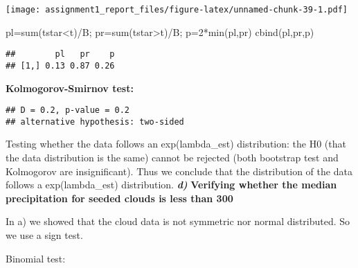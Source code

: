 \documentclass[
]{article}
\newenvironment{Shaded}{\begin{snugshade}}{\end{snugshade}}
\newcommand{\AttributeTok}[1]{\textcolor[rgb]{0.77,0.63,0.00}{#1}}
\newcommand{\DecValTok}[1]{\textcolor[rgb]{0.00,0.00,0.81}{#1}}
\newcommand{\FloatTok}[1]{\textcolor[rgb]{0.00,0.00,0.81}{#1}}
\newcommand{\FunctionTok}[1]{\textcolor[rgb]{0.00,0.00,0.00}{#1}}
\newcommand{\NormalTok}[1]{#1}
\newcommand{\OtherTok}[1]{\textcolor[rgb]{0.56,0.35,0.01}{#1}}
\newcommand{\SpecialCharTok}[1]{\textcolor[rgb]{0.00,0.00,0.00}{#1}}
\newcommand{\StringTok}[1]{\textcolor[rgb]{0.31,0.60,0.02}{#1}}
\begin{document}
\texttt{[image: assignment1\_report\_files/figure-latex/unnamed-chunk-39-1.pdf]}

\begin{Shaded}
\begin{Highlighting}[]
\NormalTok{pl}\OtherTok{=}\FunctionTok{sum}\NormalTok{(tstar}\SpecialCharTok{\textless{}}\NormalTok{t)}\SpecialCharTok{/}\NormalTok{B; pr}\OtherTok{=}\FunctionTok{sum}\NormalTok{(tstar}\SpecialCharTok{\textgreater{}}\NormalTok{t)}\SpecialCharTok{/}\NormalTok{B; p}\OtherTok{=}\DecValTok{2}\SpecialCharTok{*}\FunctionTok{min}\NormalTok{(pl,pr)}
\FunctionTok{cbind}\NormalTok{(pl,pr,p)}
\end{Highlighting}
\end{Shaded}

\begin{verbatim}
##        pl   pr    p
## [1,] 0.13 0.87 0.26
\end{verbatim}

\textbf{Kolmogorov-Smirnov test:}

\begin{Shaded}
\end{Shaded}

\begin{verbatim}
## D = 0.2, p-value = 0.2
## alternative hypothesis: two-sided
\end{verbatim}

Testing whether the data follows an exp(lambda\_est) distribution: the
H0 (that the data distribution is the same) cannot be rejected (both
bootstrap test and Kolmogorov are insignificant). Thus we conclude that
the distribution of the data follows a exp(lambda\_est) distribution.
\textbf{\emph{d)}} \textbf{Verifying whether the median precipitation
for seeded clouds is less than 300}

In a) we showed that the cloud data is not symmetric nor normal
distributed. So we use a sign test.

Binomial test:

\begin{Shaded}
\end{Shaded}
\end{document}
